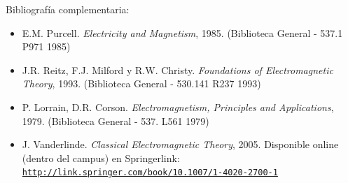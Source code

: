 \documentclass[letterpaper,10pt,onecolumn]{article}
\begin{document}
\noindent\normalsize Bibliograf\'ia complementaria:

\begin{itemize}
	\item E.M. Purcell. \textit{Electricity and Magnetism},
          1985. (Biblioteca General - 537.1 P971 1985)\\[-0.6cm] 
	\item J.R. Reitz, F.J. Milford y
          R.W. Christy. \textit{Foundations of Electromagnetic
            Theory}, 1993. (Biblioteca General - 530.141 R237
          1993)\\[-0.6cm] 
	\item P. Lorrain, D.R. Corson. \textit{Electromagnetism,
          Principles and Applications}, 1979. (Biblioteca General -
          537. L561 1979)\\[-0.6cm] 
	\item J. Vanderlinde. \textit{Classical Electromagnetic Theory}, 2005. Disponible online (dentro del campus) en Springerlink:\\
	\href{http://link.springer.com/book/10.1007/1-4020-2700-1}{\nolinkurl{http://link.springer.com/book/10.1007/1-4020-2700-1}} 
\end{itemize}
\end{document}
